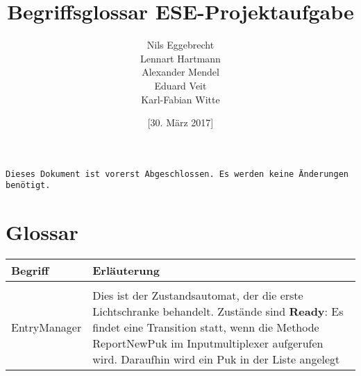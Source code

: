 \documentclass[10pt]{article}
\title{\textbf{Begriffsglossar ESE-Projektaufgabe}}
\author{Nils Eggebrecht\\
		Lennart Hartmann\\
		Alexander Mendel\\
		Eduard Veit\\
		Karl-Fabian Witte}
\date{[30. März 2017]}
\begin{document}
\newenvironment{sourceenum}{
  \vspace{-\baselineskip}
    \begin{enumerate}[leftmargin=*,noitemsep,topsep=0pt,partopsep=0pt]}
   {\end{enumerate}}
\maketitle
\texttt {Dieses Dokument ist vorerst Abgeschlossen. Es werden keine Änderungen benötigt.}
\section{Glossar}

\begin{longtable}{|p{} p{} |}
	\hline
	\textbf{Begriff} & \textbf{Erläuterung} \\ [5pt]
	\hline
	\endhead
	\hline 
	\endfoot
	

\\ \hline
	EntryManager &
	Dies ist der Zustandsautomat, der die erste Lichtschranke behandelt. Zustände sind \newline\textbf{Ready}: \newline  Es findet eine Transition statt, wenn die Methode ReportNewPuk im Inputmultiplexer aufgerufen wird. Daraufhin wird ein Puk in der Liste angelegt
\\ \hline

\end{longtable}
\end{document}
